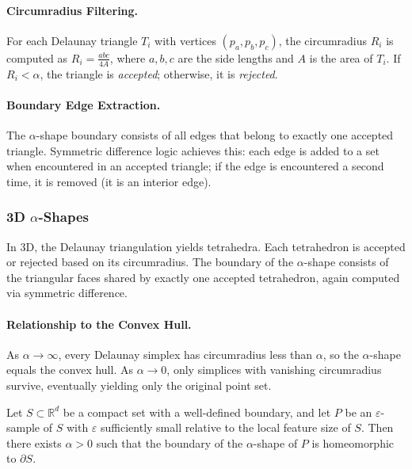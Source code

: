 \paragraph{Circumradius Filtering.}
For each Delaunay triangle $T_i$ with vertices $(p_a, p_b, p_c)$, the circumradius $R_i$ is computed as $R_i = \frac{abc}{4A}$, where $a, b, c$ are the side lengths and $A$ is the area of $T_i$. If $R_i < \alpha$, the triangle is \emph{accepted}; otherwise, it is \emph{rejected}.

\paragraph{Boundary Edge Extraction.}
The $\alpha$-shape boundary consists of all edges that belong to exactly one accepted triangle. Symmetric difference logic achieves this: each edge is added to a set when encountered in an accepted triangle; if the edge is encountered a second time, it is removed (it is an interior edge).

\subsubsection{3D $\alpha$-Shapes}

In 3D, the Delaunay triangulation yields tetrahedra. Each tetrahedron is accepted or rejected based on its circumradius. The boundary of the $\alpha$-shape consists of the triangular faces shared by exactly one accepted tetrahedron, again computed via symmetric difference.

\paragraph{Relationship to the Convex Hull.}
As $\alpha \to \infty$, every Delaunay simplex has circumradius less than $\alpha$, so the $\alpha$-shape equals the convex hull. As $\alpha \to 0$, only simplices with vanishing circumradius survive, eventually yielding only the original point set.

\begin{theorem}\label{thm:alpha_shape_topology}
Let $S \subset \mathbb{R}^d$ be a compact set with a well-defined boundary, and let $P$ be an $\varepsilon$-sample of $S$ with $\varepsilon$ sufficiently small relative to the local feature size of $S$. Then there exists $\alpha > 0$ such that the boundary of the $\alpha$-shape of $P$ is homeomorphic to $\partial S$.
\end{theorem}


